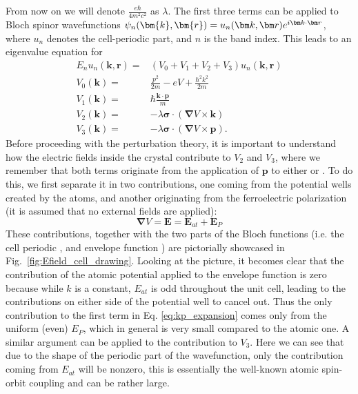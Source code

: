 From now on we will denote $\frac{e \hbar}{4m^2c^2}$ as $\lambda$.
The first three terms can be applied to Bloch spinor wavefunctions $\psi_n(\bm{k}, \bm{r}) = \Unkr \Eikr$, where $u_n$ denotes the cell-periodic part, and $n$ is the band index. This leads to an eigenvalue equation for \unkr
\begin{align}
	E_n u_n(\bm{k}, \bm{r}) =& \left(V_0 + V_1  +  V_2 + V_3 \right) u_n(\bm{k}, \bm{r}) \\
	V_0(\bm{k}) =& \frac{p^2}{2m} - eV + \frac{\hbar^2 k^2}{2m} \\
	V_1(\bm{k}) =& \hbar\frac{\bm{k}\cdot\bm{p}}{m} \\
	V_2(\bm{k}) =& -\lambda \bm{\sigma} \cdot ( \bm{\nabla}V \times \bm{k}) \\
	V_3(\bm{k}) =& -\lambda \bm{\sigma} \cdot ( \bm{\nabla}V \times \bm{p}).
\end{align}
Before proceeding with the perturbation theory, it is important to understand how the electric fields inside the crystal contribute to $V_2$ and $V_3$, where we remember that both terms originate from the application of $\bm{p}$ to either \unkr or \eikr.
To do this, we first separate it in two contributions, one coming from the potential wells created by the atoms, and another originating from the ferroelectric polarization (it is assumed that no external fields are applied):
\begin{equation}
	\bm{\nabla} V = \bm{E} = \bm{E}_{at} + \bm{E}_{P}
\end{equation}
These contributions, together with the two parts of the Bloch functions (i.e. the cell periodic \unkr, and envelope function \eikr) are pictorially showcased in Fig.~\ref{fig:Efield_cell_drawing}. 
Looking at the picture, it becomes clear that the contribution of the atomic potential applied to the envelope function is zero because while $k$ is a constant, $E_{at}$ is odd throughout the unit cell, leading to the contributions on either side of the potential well to cancel out. Thus the only contribution to the first term in Eq. \ref{eq:kp_expansion} comes only from the uniform (even) $E_P$, which in general is very small compared to the atomic one. A similar argument can be applied to the contribution to $V_3$. Here we can see that due to the shape of the periodic part of the wavefunction, only the contribution coming from $E_{at}$ will be nonzero, this is essentially the well-known atomic spin-orbit coupling and can be rather large. 


